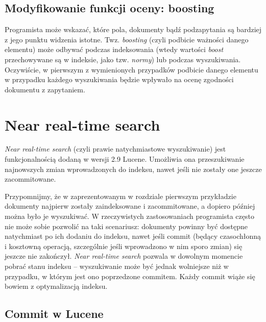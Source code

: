 \subsection{Modyfikowanie funkcji oceny: boosting}

Programista może wskazać, które pola, dokumenty bądź podzapytania są bardziej z jego punktu widzenia istotne. Twz. \emph{boosting} (czyli podbicie ważności danego elementu) może odbywać podczas indeksowania (wtedy wartości \emph{boost} przechowywane są w indeksie, jako tzw. \emph{normy}) lub podczas wyszukiwania. Oczywiście, w pierwszym z wymienionych przypadków podbicie danego elementu w przypadku każdego wyszukiwania będzie wpływało na ocenę zgodności dokumentu z zapytaniem.

\section{Near real-time search}

\emph{Near real-time search} (czyli prawie natychmiastowe wyszukiwanie) jest funkcjonalnością dodaną w wersji 2.9 Lucene. Umożliwia ona przeszukiwanie najnowszych zmian wprowadzonych do indeksu, nawet jeśli nie zostały one jeszcze zacommitowane. 

Przypomnijmy, że w zaprezentowanym w rozdziale pierwszym przykładzie dokumenty najpierw zostały zaindeksowane i zacommitowane, a dopiero później można było je wyszukiwać. W rzeczywistych zastosowaniach programista często nie może sobie pozwolić na taki scenariusz: dokumenty powinny być dostępne natychmiast po ich dodaniu do indeksu, nawet jeśli commit (będący czasochłonną i kosztowną operacją, szczególnie jeśli wprowadzono w nim sporo zmian) się jeszcze nie zakończył. \emph{Near real-time search} pozwala w dowolnym momencie pobrać stanu indeksu -- wyszukiwanie może być jednak wolniejsze niż w przypadku, w którym jest ono poprzedzone commitem. Każdy commit wiąże się bowiem z optymalizacją indeksu.

\subsection{Commit w Lucene}

